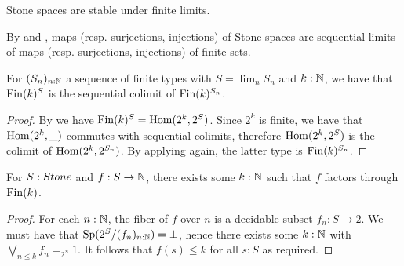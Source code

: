 \begin{corollary}
Stone spaces are stable under finite limits.
\end{corollary}
\begin{remark}\label{StoneClosedUnderPullback}\label{ProFiniteMapsFactorization}
  By  and 
  , maps (resp. surjections, injections) of Stone spaces
  are sequential limits of maps (resp. surjections, injections) of finite sets. 
%
%
%
%
\end{remark}

\begin{lemma}\label{ScottFiniteCodomain}
  For $(S_n)_{n:\mathbb{N}}$ a sequence of finite types with $S=\lim_nS_n$ and $k:\mathbb{N}$, we have that $\operatorname{Fin}(k)^{S}$ is the sequential colimit of $\operatorname{Fin}(k)^{S_n}$.
\end{lemma}
\begin{proof}
  By  we have $\operatorname{Fin}(k)^S = \mathrm{Hom}(2^{k},2^S)$.
  Since $2^{k}$ is finite, we have that $\mathrm{Hom}(2^k,\_)$ commutes with sequential colimits, therefore $\mathrm{Hom}(2^{k},2^S)$ is the colimit of $\mathrm{Hom}(2^{k},2^{S_n})$. 
  By applying  again, %
  the latter type is $\operatorname{Fin}(k)^{S_n}$.%
\end{proof}

\begin{lemma}\label{MapsStoneToNareBounded}
  For $S:\Stone$ and $f:S \to \mathbb{N}$, there exists some $k:\mathbb{N}$ such that $f$ factors through $\operatorname{Fin}(k)$. 
\end{lemma}
\begin{proof}
  For each $n:\mathbb{N}$, the fiber of $f$ over $n$ is a decidable subset $f_n:S \to 2$. 
  We must have that $\operatorname{Sp}(2^S/(f_n)_{n:\mathbb{N}}) = \bot$, hence there exists some $k:\mathbb{N}$ with 
  $\bigvee_{n\leq k} f_n =_{2^S} 1 $. 
  It follows that $f(s)\leq k$ for all $s:S$ as required. 
\end{proof}

